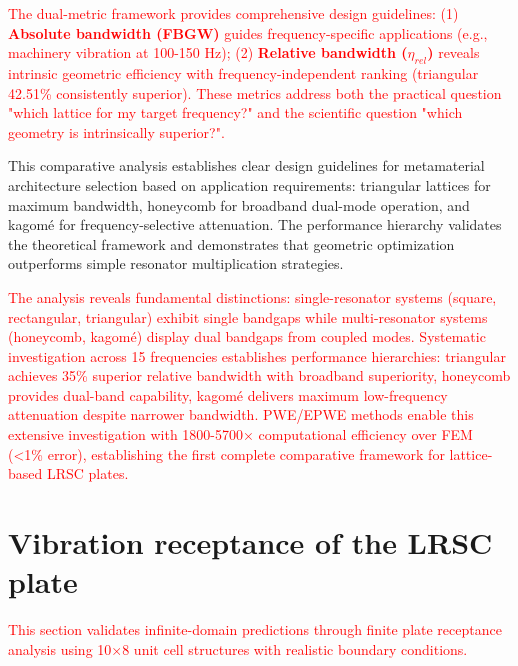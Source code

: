 \documentclass[review,numbers,sort&compress]{elsarticle}
\begin{document}
\textcolor{red}{The dual-metric framework provides comprehensive design guidelines: (1) \textbf{Absolute bandwidth (FBGW)} guides frequency-specific applications (e.g., machinery vibration at 100-150 Hz); (2) \textbf{Relative bandwidth ($\eta_{rel}$)} reveals intrinsic geometric efficiency with frequency-independent ranking (triangular 42.51\% consistently superior). These metrics address both the practical question "which lattice for my target frequency?" and the scientific question "which geometry is intrinsically superior?".}

This comparative analysis establishes clear design guidelines for metamaterial architecture selection based on application requirements: triangular lattices for maximum bandwidth, honeycomb for broadband dual-mode operation, and kagomé for frequency-selective attenuation. The performance hierarchy validates the theoretical framework and demonstrates that geometric optimization outperforms simple resonator multiplication strategies.

\textcolor{red}{The analysis reveals fundamental distinctions: single-resonator systems (square, rectangular, triangular) exhibit single bandgaps while multi-resonator systems (honeycomb, kagomé) display dual bandgaps from coupled modes. Systematic investigation across 15 frequencies establishes performance hierarchies: triangular achieves 35\% superior relative bandwidth with broadband superiority, honeycomb provides dual-band capability, kagomé delivers maximum low-frequency attenuation despite narrower bandwidth. PWE/EPWE methods enable this extensive investigation with 1800-5700× computational efficiency over FEM (<1\% error), establishing the first complete comparative framework for lattice-based LRSC plates.}
 
\section{Vibration receptance of the LRSC plate}\label{simul_trans}
\textcolor{red}{This section validates infinite-domain predictions through finite plate receptance analysis using 10×8 unit cell structures with realistic boundary conditions.}
\end{document}
